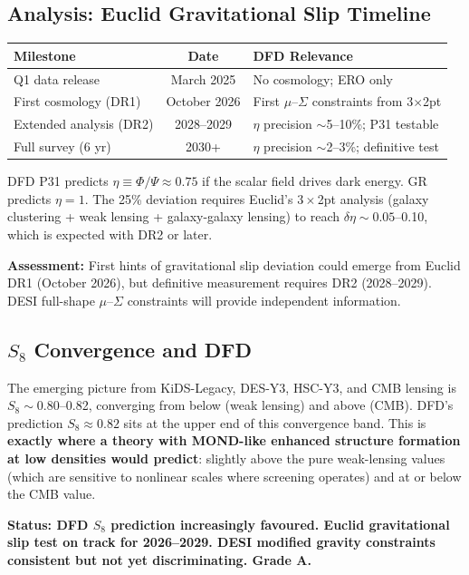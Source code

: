 \documentclass[11pt,a4paper]{article}
\begin{document}
\subsection{Analysis: Euclid Gravitational Slip Timeline}

\begin{center}
\begin{tabular}{lcl}
\toprule
\textbf{Milestone} & \textbf{Date} & \textbf{DFD Relevance} \\
\midrule
Q1 data release & March 2025 & No cosmology; ERO only \\
First cosmology (DR1) & October 2026 & First $\mu$--$\Sigma$ constraints from 3$\times$2pt \\
Extended analysis (DR2) & 2028--2029 & $\eta$ precision $\sim$5--10\%; P31 testable \\
Full survey (6 yr) & 2030+ & $\eta$ precision $\sim$2--3\%; definitive test \\
\bottomrule
\end{tabular}
\end{center}

DFD P31 predicts $\eta \equiv \Phi/\Psi \approx 0.75$ if the scalar field drives dark energy. GR predicts $\eta = 1$. The 25\% deviation requires Euclid's $3\times$2pt analysis (galaxy clustering + weak lensing + galaxy-galaxy lensing) to reach $\delta\eta \sim 0.05$--0.10, which is expected with DR2 or later.

\textbf{Assessment:} First hints of gravitational slip deviation could emerge from Euclid DR1 (October 2026), but definitive measurement requires DR2 (2028--2029). DESI full-shape $\mu$--$\Sigma$ constraints will provide independent information.

\subsection{$S_8$ Convergence and DFD}

The emerging picture from KiDS-Legacy, DES-Y3, HSC-Y3, and CMB lensing is $S_8 \sim 0.80$--0.82, converging from below (weak lensing) and above (CMB). DFD's prediction $S_8 \approx 0.82$ sits at the upper end of this convergence band. This is \textbf{exactly where a theory with MOND-like enhanced structure formation at low densities would predict}: slightly above the pure weak-lensing values (which are sensitive to nonlinear scales where screening operates) and at or below the CMB value.

\textbf{Status: DFD $S_8$ prediction increasingly favoured. Euclid gravitational slip test on track for 2026--2029. DESI modified gravity constraints consistent but not yet discriminating. Grade A.}
\end{document}
